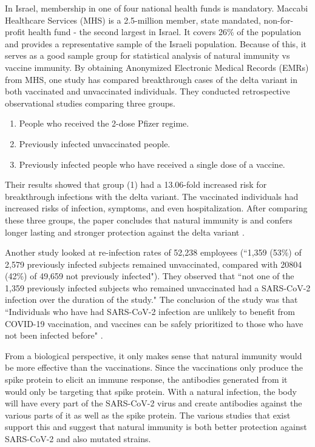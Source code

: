 \documentclass[10pt, a4paper, twocolumn]{book}
\begin{document}
In Israel, membership in one of four national health funds is mandatory. Maccabi Healthcare Services (MHS) is a 2.5-million member, state mandated, non-for-profit health fund - the second largest in Israel. It covers 26\% of the population and provides a representative sample of the Israeli population. Because of this, it serves as a good sample group for statistical analysis of natural immunity vs vaccine immunity. By obtaining Anonymized Electronic Medical Records (EMRs) from MHS, one study has compared breakthrough cases of the delta variant in both vaccinated and unvaccinated individuals. They conducted retrospective observational studies comparing three groups. 
\begin{enumerate}
	\item People who received the 2-dose Pfizer regime.
	\item Previously infected unvaccinated people.
	\item Previously infected people who have received a single dose of a vaccine.
\end{enumerate}
Their results showed that group (1) had a 13.06-fold increased risk for breakthrough infections with the delta variant. The vaccinated individuals had increased risks of infection, symptoms, and even hospitalization. After comparing these three groups, the paper concludes that natural immunity is and confers longer lasting and stronger protection against the delta variant \citep{NaturalImmunityIsrael}. 

Another study looked at re-infection rates of 52,238 employees (``1,359 (53\%) of 2,579 previously infected subjects remained unvaccinated, compared with 20804 (42\%) of 49,659 not previously infected"). They observed that ``not one of the 1,359 previously infected subjects who remained unvaccinated had a SARS-CoV-2 infection over the duration of the study." The conclusion of the study was that ``Individuals who have had SARS-CoV-2 infection are unlikely to benefit from COVID-19 vaccination, and vaccines can be safely prioritized to those who have not been infected before" \citep{NecessityOfVaccination}.

From a biological perspective, it only makes sense that natural immunity would be more effective than the vaccinations. Since the vaccinations only produce the spike protein to elicit an immune response, the antibodies generated from it would only be targeting that spike protein. With a natural infection, the body will have every part of the SARS-CoV-2 virus and create antibodies against the various parts of it as well as the spike protein. The various studies that exist support this and suggest that natural immunity is both better protection against SARS-CoV-2 and also mutated strains.
\end{document}
